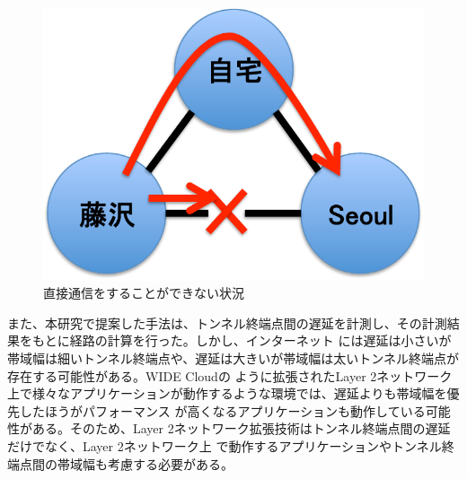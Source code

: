 \begin{figure}
	\begin{center}
		\includegraphics[scale=0.60]{./img/tenbou1}
		\caption{直接通信をすることができない状況}
		\label{img:tenbou1}
	\end{center}
\end{figure}

また、本研究で提案した手法は、トンネル終端点間の遅延を計測し、その計測結果をもとに経路の計算を行った。しかし、インターネット
には遅延は小さいが帯域幅は細いトンネル終端点や、遅延は大きいが帯域幅は太いトンネル終端点が存在する可能性がある。WIDE Cloudの
ように拡張されたLayer 2ネットワーク上で様々なアプリケーションが動作するような環境では、遅延よりも帯域幅を優先したほうがパフォーマンス
が高くなるアプリケーションも動作している可能性がある。そのため、Layer 2ネットワーク拡張技術はトンネル終端点間の遅延だけでなく、Layer 2ネットワーク上
で動作するアプリケーションやトンネル終端点間の帯域幅も考慮する必要がある。

